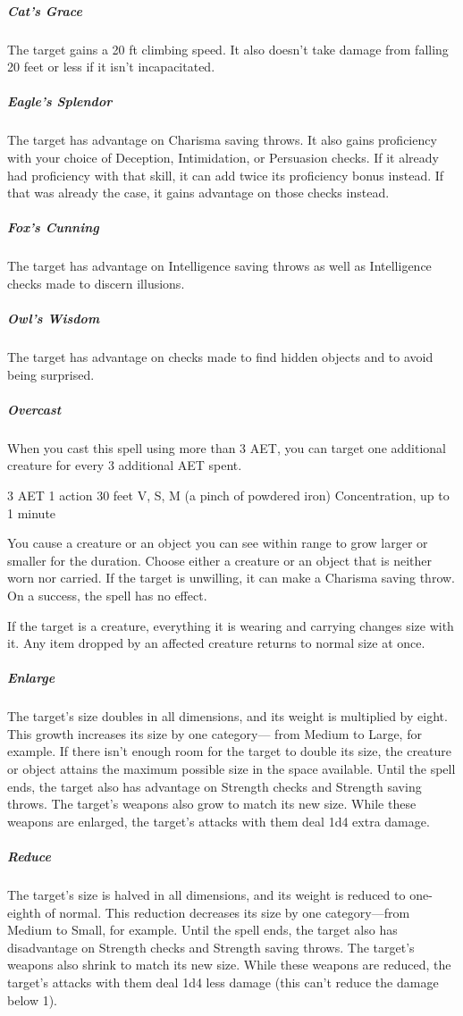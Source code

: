 \subparagraph*{Cat's Grace} The target gains a 20 ft climbing speed. It also doesn't take damage from falling 20 feet or less if it isn't incapacitated.

\subparagraph*{Eagle's Splendor} The target has advantage on Charisma saving throws. It also gains proficiency with your choice of Deception, Intimidation, or Persuasion checks. If it already had proficiency with that skill, it can add twice its proficiency bonus instead. If that was already the case, it gains advantage on those checks instead.

\subparagraph*{Fox's Cunning} The target has advantage on Intelligence saving throws as well as Intelligence checks made to discern illusions.

\subparagraph*{Owl's Wisdom} The target has advantage on checks made to find hidden objects and to avoid being surprised.

\subparagraph*{Overcast} When you cast this spell using more than 3 AET, you can target one additional creature for every 3 additional AET spent.


{3 AET}
{1 action}
{30 feet}
{V, S, M (a pinch of powdered iron)}
{Concentration, up to 1 minute}

You cause a creature or an object you can see within range to grow larger or smaller for the duration. Choose either a creature or an object that is neither worn nor carried. If the target is unwilling, it can make a Charisma saving throw. On a success, the spell has no effect.

If the target is a creature, everything it is wearing and carrying changes size with it. Any item dropped by an affected creature returns to normal size at once.

\subparagraph*{Enlarge} The target's size doubles in all dimensions, and its weight is multiplied by eight. This growth increases its size by one category— from Medium to Large, for example. If there isn't enough room for the target to double its size, the creature or object attains the maximum possible size in the space available. Until the spell ends, the target also has advantage on Strength checks and Strength saving throws. The target's weapons also grow to match its new size. While these weapons are enlarged, the target's attacks with them deal 1d4 extra damage.

\subparagraph*{Reduce} The target's size is halved in all dimensions, and its weight is reduced to one-eighth of normal. This reduction decreases its size by one category—from Medium to Small, for example. Until the spell ends, the target also has disadvantage on Strength checks and Strength saving throws. The target's weapons also shrink to match its new size. While these weapons are reduced, the target's attacks with them deal 1d4 less damage (this can't reduce the damage below 1).



